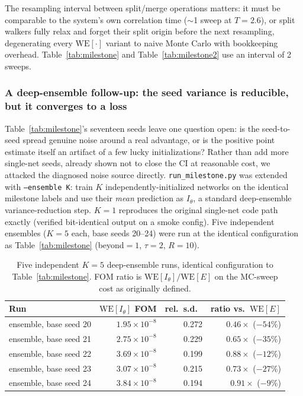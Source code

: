 \documentclass[a4paper,fleqn]{cas-sc}
\begin{document}
The resampling interval between split/merge operations matters: it must be comparable to
the system's own correlation time ($\sim$1 sweep at $T=2.6$), or split walkers fully relax
and forget their split origin before the next resampling, degenerating every
$\mathrm{WE}[\cdot]$ variant to naive Monte Carlo with bookkeeping overhead. Table~\ref{tab:milestone}
and Table~\ref{tab:milestone2} use an interval of 2 sweeps.

\subsubsection{A deep-ensemble follow-up: the seed variance is reducible, but it converges
	to a loss}
\label{sec:ensemble}
Table~\ref{tab:milestone}'s seventeen seeds leave one question open: is the
seed-to-seed spread genuine noise around a real advantage, or is the positive point
estimate itself an artifact of a few lucky initializations? Rather than add more single-net
seeds, already shown not to close the CI at reasonable cost, we attacked the diagnosed
noise source directly. \texttt{run\_milestone.py} was extended with \texttt{--ensemble
	K}: train $K$ independently-initialized networks on the identical milestone labels and
use their \emph{mean} prediction as $I_\theta$, a standard deep-ensemble variance-reduction
step. $K=1$ reproduces the original single-net code path exactly (verified bit-identical
output on a smoke config). Five independent ensembles ($K=5$ each, base seeds 20--24) were
run at the identical configuration as Table~\ref{tab:milestone} (beyond$=1$, $\tau=2$, $R=10$).

\begin{table}[h]
	\centering\small
	\caption{Five independent $K{=}5$ deep-ensemble runs, identical configuration to
		Table~\ref{tab:milestone}. FOM ratio is $\mathrm{WE}[I_\theta]/\mathrm{WE}[E]$ on the
		MC-sweep cost as originally defined.}
	\label{tab:ensemble}
	\begin{tabular}{lrrr}
		\toprule
		Run & $\mathrm{WE}[I_\theta]$ FOM & rel.\ s.d.\ & ratio vs.\ $\mathrm{WE}[E]$ \\
		\midrule
		ensemble, base seed 20 & $1.95\times10^{-8}$ & 0.272 & $0.46\times$ ($-54\%$) \\
		ensemble, base seed 21 & $2.75\times10^{-8}$ & 0.229 & $0.65\times$ ($-35\%$) \\
		ensemble, base seed 22 & $3.69\times10^{-8}$ & 0.199 & $0.88\times$ ($-12\%$) \\
		ensemble, base seed 23 & $3.07\times10^{-8}$ & 0.215 & $0.73\times$ ($-27\%$) \\
		ensemble, base seed 24 & $3.84\times10^{-8}$ & 0.194 & $0.91\times$ ($-9\%$) \\
		\bottomrule
	\end{tabular}
\end{table}
\end{document}
